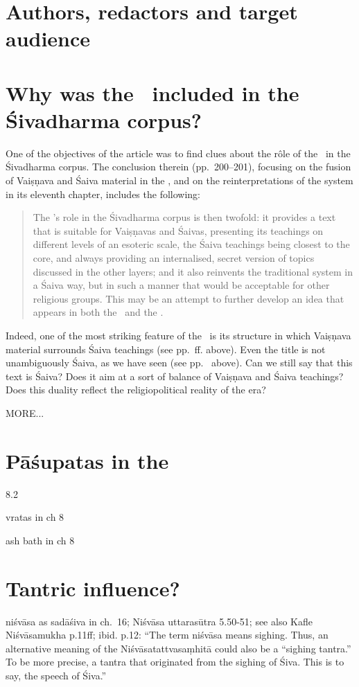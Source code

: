 \section{Authors, redactors and target audience}


\section{Why was the \VSS\ included in the Śivadharma corpus?}

One of the objectives of the article 
 was
to find clues about the r\^ole of the \VSS\ in the Śivadharma corpus.
The conclusion  therein (pp.~200--201), focusing on the fusion of 
Vaiṣṇava and Śaiva material in the \VSS, and on the reinterpretations of 
the  system in its eleventh chapter, includes the following:

\begin{quote}
The \Vss's role in the Śivadharma corpus is then twofold: 
it provides a text that is suitable for Vaiṣṇavas and Śaivas,
presenting its teachings on different levels of an esoteric scale, 
the Śaiva teachings being closest to the core, and always
providing an internalised, secret version of topics 
discussed in the other layers; and it also reinvents the traditional 
 system in a Śaiva way,
but in such a manner that would be acceptable for other religious groups. 
This may be an attempt to further develop an idea that appears in both 
the \SDhS\ and the \SDhU.
\end{quote}

\noindent
Indeed, one of the most striking feature of the \VSS\
is its structure in which Vaiṣṇava material surrounds
Śaiva teachings (see pp.~\pageref{structure}\thinspace ff. above). 
Even the title is not unambiguously Śaiva, as
we have seen (see pp.~\pageref{title} above).
Can we still say that this text is Śaiva? Does it
aim at a sort of balance of Vaiṣṇava and Śaiva
teachings? Does this duality reflect the 
religio\-political reality of the era?

MORE...

\section{Pāśupatas in the \VSS}

8.2

vratas in ch 8

ash bath in ch 8

\section{Tantric influence?}
niśvāsa as sadāśiva in ch.~16; Niśvāsa uttarasūtra 5.50-51; see also Kafle Niśvāsamukha p.11ff; ibid. p.12: ``The term niśvāsa means sighing. Thus, an alternative meaning of the Niśvāsatattvasaṃhitā could also be a ``sighing tantra.'' To be more precise, a tantra that originated from the sighing of Śiva. This is to say, the speech of Śiva.''

